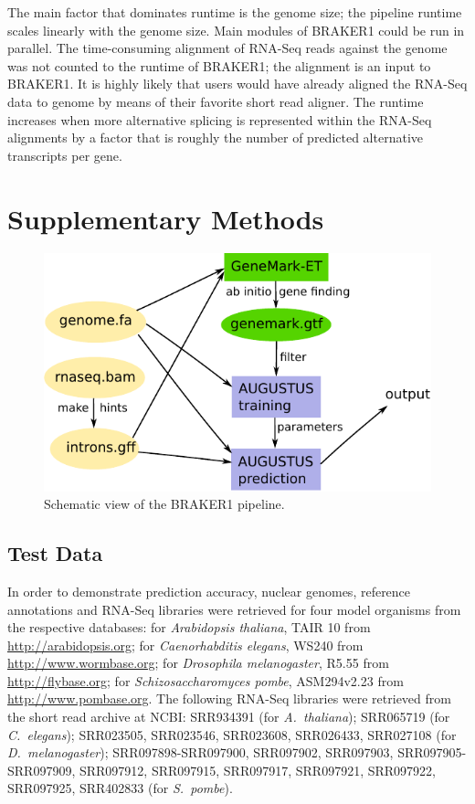 \documentclass[a4paper,10pt]{report}
\begin{document}
The main factor that dominates runtime is the genome size; the pipeline runtime scales linearly with the genome size. Main modules of BRAKER1 could be run in parallel. The time-consuming alignment of RNA-Seq reads against the genome was not counted to the runtime of BRAKER1; the alignment is an input to BRAKER1. 
It is highly likely that users would have already aligned the RNA-Seq data to genome by means of their favorite short read aligner. 
The runtime increases when more alternative splicing is represented within the RNA-Seq alignments by a factor that is roughly the number of predicted alternative transcripts per gene.


\chapter{Supplementary Methods}

\begin{figure}[!h]%
\centerline{\includegraphics[width=0.7\linewidth]{figs/Figure1.pdf}}
\caption{Schematic view of the BRAKER1 pipeline.}\label{pipeline}
\end{figure}

\section{Test Data}

In order to demonstrate prediction accuracy, nuclear genomes, reference annotations and RNA-Seq libraries were retrieved for four model organisms from the respective databases: for \textit{Arabidopsis thaliana}, TAIR 10 from \url{http://arabidopsis.org}; for \textit{Caenorhabditis elegans}, WS240 from \url{http://www.wormbase.org}; for \textit{Drosophila melanogaster}, R5.55 from \url{http://flybase.org}; for \textit{Schizosaccharomyces pombe}, ASM294v2.23 from \url{http://www.pombase.org}. The following RNA-Seq libraries were retrieved from the short read archive at NCBI: SRR934391 (for \textit{A.~thaliana}); SRR065719 (for \textit{C.~elegans}); SRR023505, SRR023546, SRR023608, SRR026433, SRR027108 (for \textit{D.~melanogaster}); SRR097898-SRR097900, SRR097902, SRR097903,
SRR097905-SRR097909, SRR097912, SRR097915, SRR097917, SRR097921, SRR097922, SRR097925, SRR402833 (for \textit{S.~pombe}).
\end{document}
